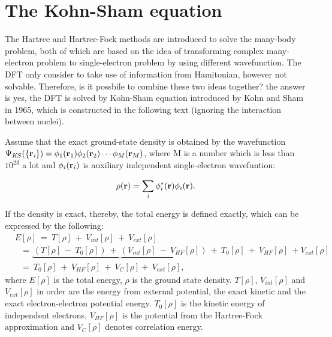 \documentclass[a4paper, 12pt, titlepage,oneside,drop]{kthesis}
\begin{document}
\section{The Kohn-Sham equation}

\noindent The Hartree and Hartree-Fock methods are introduced to solve the many-body problem, both of which are based on the idea of transforming complex 
many-electron problem to single-electron problem by using different wavefunction. The DFT only consider to take use of information from Hamitonian, however not solvable. 
Therefore, is it possbile to combine these two ideas together? the answer is yes, the DFT is solved by Kohn-Sham equation introduced by Kohn and Sham in 1965,
which is constructed in the following text (ignoring the interaction between nuclei).

Assume that the exact ground-state density is obtained by the wavefunction $\wfks = \bwf<1><1> \bwf<2><2> \cdots \bwf<M><M>$, where M is a number which is 
less than $10^{23}$ a lot and $\bwf<i><i>$ is auxiliary independent single-electron wavefuntion:

\begin{equation}\label{ks1}
 \rho(\textbf{r}) = \sumi<i> {\phi^{*}_{i}(\textbf{r})} {\phi_{i}(\textbf{r})}.
\end{equation}



\noindent If the density is exact, thereby, the total energy is defined exactly, which can be expressed by the following:
\begin{equation}\label{kse}
\begin{split}
&E[\rho] \ =\ T[\rho] \ + \ V_\textit{int}[\rho] \ + \ V_\textit{ext}[\rho]  \\
&\ \ \   = \underbrace{\ (T[\rho] \ - \ T_{0}[\rho]) \ + \  (V_\textit{int}[\rho] \ - \ V_\textit{HF}[\rho])\ }+ \ T_{0}[\rho] \ + \ V_\textit{HF}[\rho] \ + V_\textit{ext}[\rho]       \\
&\ \ \   = \ T_{0}[\rho] \ + \ V_\textit{HF}[\rho] \ + \ V_\textit{C}[\rho] +\ V_\textit{ext}[\rho],
\end{split}
\end{equation}
\noindent where $E[\rho]$  is the total energy, $\rho$ is the ground state density. $T[\rho]$, $V_\textit{int}[\rho]$ and $V_\textit{ext}[\rho]$ in order are the energy from external potential, the exact kinetic 
and the exact electron-electron potential energy. $T_{0}[\rho]$ is the kinetic energy of independent electrons, $V_\textit{HF}[\rho]$ is the potential from the Hartree-Fock approximation and $V_\textit{C}[\rho]$
denotes correlation energy.
\end{document}
